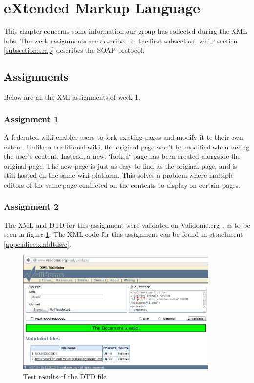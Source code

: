 \section{eXtended Markup Language}
This chapter concerns some information our group has collected during the XML labs. The week assignments are described in the first subsection, while section \ref{subsection:soap} describes the SOAP protocol.

\subsection{Assignments}
Below are all the XMl assignments of week 1.

\subsubsection{Assignment 1}
 A federated wiki enables users to fork existing pages and modify it to their own extent. Unlike a traditional wiki, the original page won't be modified when saving the user's content. Instead, a new, `forked` page has been created alongside the original page. The new page is just as easy to find as the original page, and is still hosted on the same wiki platform. This solves a problem where multiple editors of the same page conflicted on the contents to display on certain pages.

\subsubsection{Assignment 2}
The XML and DTD for this assignment were validated on Validome.org , as to be seen in figure \ref{fig:xmldtdtest}. The XML code for this assignment can be found in attachment \ref{appendice:xmldtdsrc}.
\begin{figure}[h]
	\centering
	\includegraphics[width=100mm]{img/xmldtdtest.png}
	\caption{Test results of the DTD file}\label{fig:xmldtdtest}
\end{figure}

